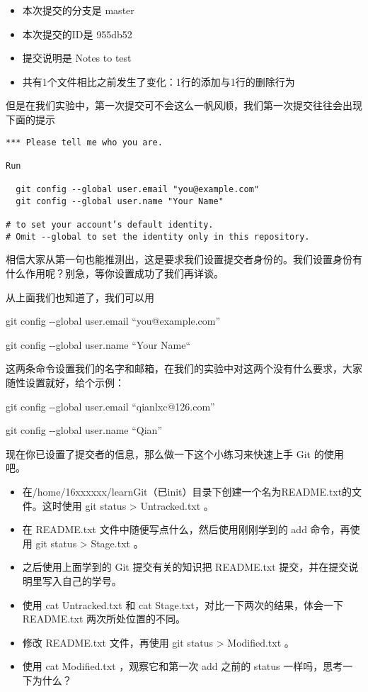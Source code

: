\begin{itemize}
\item 本次提交的分支\label{分支}是 master
\item 本次提交的ID是 955db52
\item 提交说明是 Notes to test
\item 共有1个文件相比之前发生了变化：1行的添加与1行的删除行为
\end{itemize}

但是在我们实验中，第一次提交可不会这么一帆风顺，我们第一次提交往往会出现 下面的提示
\begin{verbatim}
*** Please tell me who you are.

Run

  git config --global user.email "you@example.com"
  git config --global user.name "Your Name"

# to set your account’s default identity.
# Omit --global to set the identity only in this repository.
\end{verbatim}

相信大家从第一句也能推测出，这是要求我们设置提交者身份的。我们设置身份有 什么作用呢？别急，等你设置成功了我们再详谈。

\begin{note}
从上面我们也知道了，我们可以用  

  git config -{}-global user.email “you@example.com”
  
  git config -{}-global user.name “Your Name“
  
这两条命令设置我们的名字和邮箱，在我们的实验中对这两个没有什么要求，大家随性设置就好，给个示例：

  git config -{}-global user.email “qianlxc@126.com”
  
  git config -{}-global user.name “Qian”
\end{note}

现在你已设置了提交者的信息，那么做一下这个小练习来快速上手 Git 的使用吧。

\begin{exercise}
\begin{itemize}
    \item 在/home/16xxxxxx/learnGit（已init）目录下创建一个名为README.txt的文件。这时使用 git status > Untracked.txt 。
	\item 在 README.txt 文件中随便写点什么，然后使用刚刚学到的 add 命令，再使用 git status > Stage.txt 。
	\item 之后使用上面学到的 Git 提交有关的知识把 README.txt 提交，并在提交说明里写入自己的学号。
	\item 使用 cat Untracked.txt 和 cat Stage.txt，对比一下两次的结果，体会一下README.txt 两次所处位置的不同。
	\item 修改 README.txt 文件，再使用 git status > Modified.txt 。
	\item 使用 cat Modified.txt ，观察它和第一次 add 之前的 status 一样吗，思考一 下为什么？
\end{itemize}
\end{exercise}

